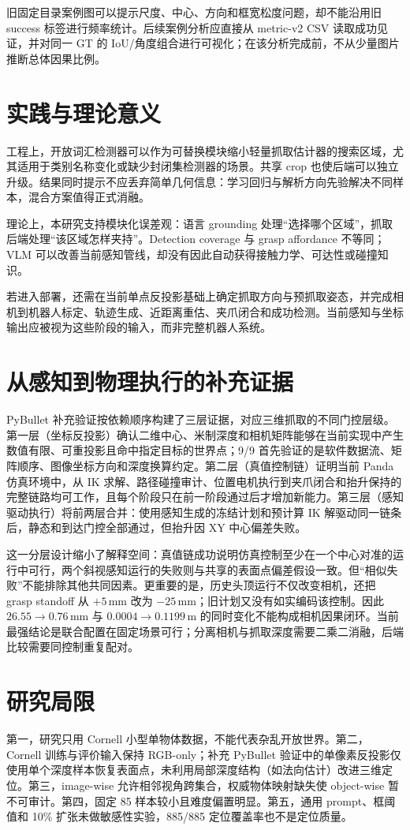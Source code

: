 \documentclass{l4proj}
\begin{document}
旧固定目录案例图可以提示尺度、中心、方向和框宽松度问题，却不能沿用旧 success 标签进行频率统计。后续案例分析应直接从 metric-v2 CSV 读取成功见证，并对同一 GT 的 IoU/角度组合进行可视化；在该分析完成前，不从少量图片推断总体因果比例。

\section{实践与理论意义}
工程上，开放词汇检测器可以作为可替换模块缩小轻量抓取估计器的搜索区域，尤其适用于类别名称变化或缺少封闭集检测器的场景。共享 crop 也使后端可以独立升级。结果同时提示不应丢弃简单几何信息：学习回归与解析方向先验解决不同样本，混合方案值得正式消融。

理论上，本研究支持模块化误差观：语言 grounding 处理“选择哪个区域”，抓取后端处理“该区域怎样夹持”。Detection coverage 与 grasp affordance 不等同；VLM 可以改善当前感知管线，却没有因此自动获得接触力学、可达性或碰撞知识。

若进入部署，还需在当前单点反投影基础上确定抓取方向与预抓取姿态，并完成相机到机器人标定、轨迹生成、近距离重估、夹爪闭合和成功检测。当前感知与坐标输出应被视为这些阶段的输入，而非完整机器人系统。

\section{从感知到物理执行的补充证据}
PyBullet 补充验证按依赖顺序构建了三层证据，对应三维抓取的不同门控层级。第一层（坐标反投影）确认二维中心、米制深度和相机矩阵能够在当前实现中产生数值有限、可重投影且命中指定目标的世界点；9/9 首先验证的是软件数据流、矩阵顺序、图像坐标方向和深度换算约定。第二层（真值控制链）证明当前 Panda 仿真环境中，从 IK 求解、路径碰撞审计、位置电机执行到夹爪闭合和抬升保持的完整链路均可工作，且每个阶段只在前一阶段通过后才增加新能力。第三层（感知驱动执行）将前两层合并：使用感知生成的冻结计划和预计算 IK 解驱动同一链条后，静态和到达门控全部通过，但抬升因 XY 中心偏差失败。

这一分层设计缩小了解释空间：真值链成功说明仿真控制至少在一个中心对准的运行中可行，两个斜视感知运行的失败则与共享的表面点偏差假设一致。但“相似失败”不能排除其他共同因素。更重要的是，历史头顶运行不仅改变相机，还把 grasp standoff 从 $+5$\,mm 改为 $-25$\,mm；旧计划又没有如实编码该控制。因此 $26.55\rightarrow0.76$\,mm 与 $0.0004\rightarrow0.1199$\,m 的同时变化不能构成相机因果闭环。当前最强结论是联合配置在固定场景可行；分离相机与抓取深度需要二乘二消融，后端比较需要同控制重复配对。

\section{研究局限}
第一，研究只用 Cornell 小型单物体数据，不能代表杂乱开放世界。第二，Cornell 训练与评价输入保持 RGB-only；补充 PyBullet 验证中的单像素反投影仅使用单个深度样本恢复表面点，未利用局部深度结构（如法向估计）改进三维定位。第三，image-wise 允许相邻视角跨集合，权威物体映射缺失使 object-wise 暂不可审计。第四，固定 85 样本较小且难度偏置明显。第五，通用 prompt、框阈值和 10\% 扩张未做敏感性实验，885/885 定位覆盖率也不是定位质量。
\end{document}
